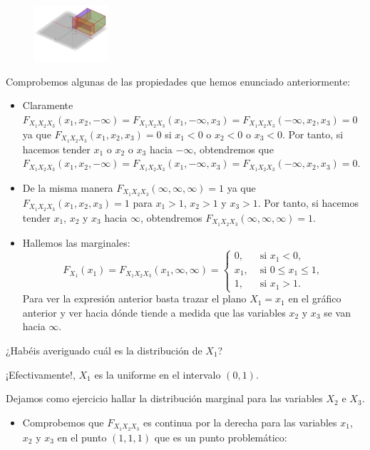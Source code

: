 \documentclass[
  letterpaper,
  DIV=11,
  numbers=noendperiod]{scrreprt}
\providecommand{\tightlist}{%
  \setlength{\itemsep}{0pt}\setlength{\parskip}{0pt}}\usepackage{longtable,booktabs,array}
\begin{document}
\begin{figure}

{\centering \includegraphics[width=1.08in,height=\textheight]{Images/Ej3DFxy2pis.png}

}

\end{figure}

Comprobemos algunas de las propiedades que hemos enunciado
anteriormente:

\begin{itemize}
\item
  Claramente
  \(F_{X_1X_2X_3}(x_1,x_2,-\infty)=F_{X_1X_2X_3}(x_1,-\infty,x_3)=F_{X_1X_2X_3}(-\infty,x_2,x_3)=0\)
  ya que \(F_{X_1X_2X_3}(x_1,x_2,x_3)=0\) si \(x_1<0\) o \(x_2<0\) o
  \(x_3<0\). Por tanto, si hacemos tender \(x_1\) o \(x_2\) o \(x_3\)
  hacia \(-\infty\), obtendremos que
  \(F_{X_1X_2X_3}(x_1,x_2,-\infty)=F_{X_1X_2X_3}(x_1,-\infty,x_3)=F_{X_1X_2X_3}(-\infty,x_2,x_3)=0\).
\item
  De la misma manera \(F_{X_1X_2X_3}(\infty,\infty,\infty)=1\) ya que
  \(F_{X_1X_2X_3}(x_1,x_2,x_3)=1\) para \(x_1>1\), \(x_2>1\) y
  \(x_3>1\). Por tanto, si hacemos tender \(x_1\), \(x_2\) y \(x_3\)
  hacia \(\infty\), obtendremos
  \(F_{X_1X_2X_3}(\infty,\infty,\infty)=1\).
\item
  Hallemos las marginales: \[
  F_{X_1}(x_1)=F_{X_1X_2X_3}(x_1,\infty,\infty)=\begin{cases}
  0, & \mbox{ si }x_1 < 0,\\
  x_1, & \mbox{ si } 0\leq x_1\leq 1,\\
  1, & \mbox{ si } x_1>1.
  \end{cases}
  \] Para ver la expresión anterior basta trazar el plano \(X_1=x_1\) en
  el gráfico anterior y ver hacia dónde tiende a medida que las
  variables \(x_2\) y \(x_3\) se van hacia \(\infty\).
\end{itemize}

¿Habéis averiguado cuál es la distribución de \(X_1\)?

¡Efectivamente!, \(X_1\) es la uniforme en el intervalo \((0,1)\).

Dejamos como ejercicio hallar la distribución marginal para las
variables \(X_2\) e \(X_3\).

\begin{itemize}
\tightlist
\item
  Comprobemos que \(F_{X_1X_2X_3}\) es continua por la derecha para las
  variables \(x_1\), \(x_2\) y \(x_3\) en el punto \((1,1,1)\) que es un
  punto problemático:
\end{itemize}
\end{document}
